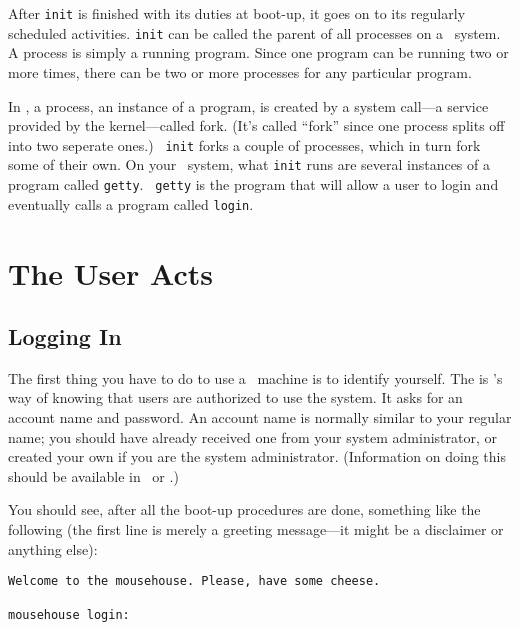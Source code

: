 After {\tt init} is finished with its duties at boot-up,
it goes on to its regularly scheduled activities. {{\tt init}}
 can be called the parent of all processes
 on a \unix\ system.  A process is
simply a running program.  Since one program can be running two or
more times, there can be two or more processes for any particular
program.

In \unix, a process, an instance of a program, is
created by a system call---a service provided by
the kernel---called fork.  (It's called
``fork'' since one process splits off into two seperate ones.)  {\tt
  init} forks a couple of processes, which in turn fork
some of their own. On your \linux\ system, what {\tt init} runs are
several instances of a program called {\tt getty}. {\tt
  getty} is the program that will allow a user to login and eventually
calls a program called {\tt login}.

\section{The User Acts}\label{actual-login-section}

\subsection{Logging In}

The first thing you have to do to use a \unix\ machine is to identify
yourself.  The  is \unix's way of knowing that users
are authorized to use the system.  It asks for an account
name and password. An account name is
normally similar to your regular name; you should have already
received one from your system administrator, or created your own if
you are the system administrator. (Information on doing this should be
available in \ldpgs\ or \ldpsa.)

You should see, after all the boot-up procedures are done, something
like the following (the first line is merely a greeting message---it
might be a disclaimer or anything else):

\begin{screen}\begin{verbatim}
Welcome to the mousehouse. Please, have some cheese.

mousehouse login:
\end{verbatim}\end{screen}

